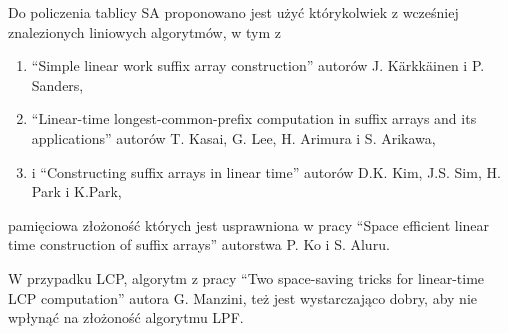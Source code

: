 \documentclass[a4paper,12pt]{article}
\begin{document}
Do policzenia tablicy SA proponowano jest użyć którykolwiek z wcześniej znalezionych liniowych algorytmów, w tym z
\begin{enumerate}
\item ``Simple linear work suffix array construction'' autorów J. Kärkkäinen i P. Sanders,
\item ``Linear-time longest-common-prefix computation in suffix arrays and its applications'' autorów T. Kasai, G. Lee, H. Arimura i S. Arikawa,
\item i ``Constructing suffix arrays in linear time'' autorów D.K. Kim, J.S. Sim, H. Park i K.Park,
\end{enumerate}
pamięciowa złożoność których jest usprawniona w pracy ``Space efficient linear time construction of suffix arrays'' autorstwa P. Ko i S. Aluru.

W przypadku LCP, algorytm z pracy ``Two space-saving tricks for linear-time LCP computation'' autora G. Manzini,
też jest wystarczająco dobry, aby nie wpłynąć na złożoność algorytmu LPF.
\end{document}
